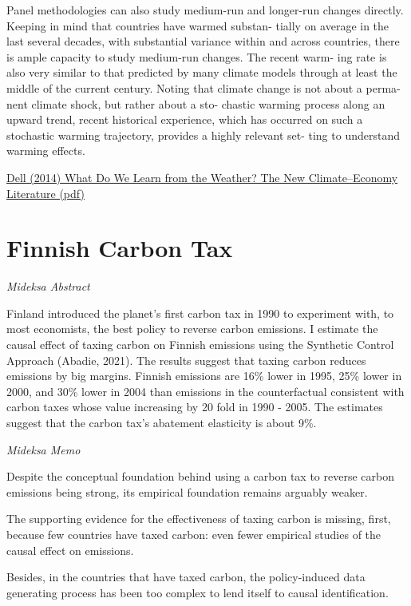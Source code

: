 \documentclass[
]{book}
\begin{document}
Panel
methodologies can also study medium-run
and longer-run changes directly. Keeping in
mind that countries have warmed substan-
tially on average in the last several decades,
with substantial variance within and across
countries, there is ample capacity to study
medium-run changes. The recent warm-
ing rate is also very similar to that predicted
by many climate models through at least
the middle of the current century. Noting
that climate change is not about a perma-
nent climate shock, but rather about a sto-
chastic warming process along an upward
trend, recent historical experience, which
has occurred on such a stochastic warming
trajectory, provides a highly relevant set-
ting to understand warming effects.

\href{pdf/Dell_2014\%20_The_New_Climate_Economy_Litterature.pdf}{Dell (2014) What Do We Learn from the Weather? The New Climate--Economy Literature (pdf)}

\hypertarget{finnish-carbon-tax}{%
\section{Finnish Carbon Tax}\label{finnish-carbon-tax}}

\emph{Mideksa Abstract}

Finland introduced the planet's first carbon tax in 1990 to experiment with, to most economists,
the best policy to reverse carbon emissions. I estimate the causal effect of taxing carbon on Finnish
emissions using the Synthetic Control Approach (Abadie, 2021). The results suggest that taxing
carbon reduces emissions by big margins. Finnish emissions are 16\% lower in 1995, 25\% lower
in 2000, and 30\% lower in 2004 than emissions in the counterfactual consistent with carbon taxes
whose value increasing by 20 fold in 1990 - 2005. The estimates suggest that the carbon tax's
abatement elasticity is about 9\%.

\emph{Mideksa Memo}

Despite the conceptual
foundation behind using a carbon tax to reverse carbon emissions being strong, its
empirical foundation remains arguably weaker.

The supporting evidence for the effectiveness of taxing carbon is missing, first,
because few countries have taxed carbon: even fewer empirical studies of the causal
effect on emissions.

Besides, in the countries that have
taxed carbon, the policy-induced data generating process has been too complex to lend
itself to causal identification.
\end{document}
